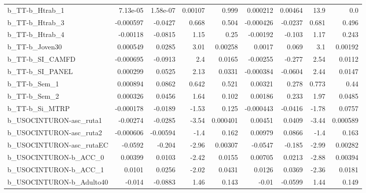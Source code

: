\begin{tabular}{lrrrrrrrr}
b\_TT-b\_Htrab\_1             &    7.13e-05 &     1.58e-07 &  0.00107 &    0.999 &   0.000212 &     0.00464 &         13.9 &           0.0 \\
b\_TT-b\_Htrab\_3             &   -0.000597 &      -0.0427 &    0.668 &    0.504 &  -0.000426 &     -0.0237 &        0.681 &         0.496 \\
b\_TT-b\_Htrab\_4             &    -0.00118 &      -0.0815 &     1.15 &     0.25 &   -0.00192 &      -0.103 &         1.17 &         0.243 \\
b\_TT-b\_Joven30             &    0.000549 &       0.0285 &     3.01 &  0.00258 &     0.0017 &       0.069 &          3.1 &       0.00192 \\
b\_TT-b\_SI\_CAMFD            &   -0.000695 &      -0.0913 &      2.4 &   0.0165 &   -0.00255 &      -0.277 &         2.54 &        0.0112 \\
b\_TT-b\_SI\_PANEL            &    0.000299 &       0.0525 &     2.13 &   0.0331 &  -0.000384 &     -0.0604 &         2.44 &        0.0147 \\
b\_TT-b\_Sem\_1               &    0.000894 &       0.0862 &    0.642 &    0.521 &    0.00321 &       0.278 &        0.773 &          0.44 \\
b\_TT-b\_Sem\_2               &    0.000326 &       0.0456 &     1.64 &    0.102 &    0.00186 &       0.233 &         1.97 &        0.0485 \\
b\_TT-b\_Si\_MTRP             &   -0.000178 &      -0.0189 &    -1.53 &    0.125 &  -0.000443 &     -0.0416 &        -1.78 &        0.0757 \\
b\_USOCINTURON-asc\_ruta1    &    -0.00274 &      -0.0285 &    -3.54 & 0.000401 &    0.00451 &      0.0409 &        -3.44 &      0.000589 \\
b\_USOCINTURON-asc\_ruta2    &   -0.000606 &     -0.00594 &     -1.4 &    0.162 &    0.00979 &      0.0866 &         -1.4 &         0.163 \\
b\_USOCINTURON-asc\_rutaEC   &     -0.0592 &       -0.204 &    -2.96 &  0.00307 &    -0.0547 &      -0.185 &        -2.99 &       0.00282 \\
b\_USOCINTURON-b\_ACC\_0      &     0.00399 &       0.0103 &    -2.42 &   0.0155 &    0.00705 &      0.0213 &        -2.88 &       0.00394 \\
b\_USOCINTURON-b\_ACC\_1      &      0.0101 &       0.0256 &    -2.02 &   0.0431 &     0.0126 &      0.0369 &        -2.36 &        0.0181 \\
b\_USOCINTURON-b\_Adulto40   &      -0.014 &      -0.0883 &     1.46 &    0.143 &      -0.01 &     -0.0599 &         1.44 &         0.149 \\

\end{tabular}
